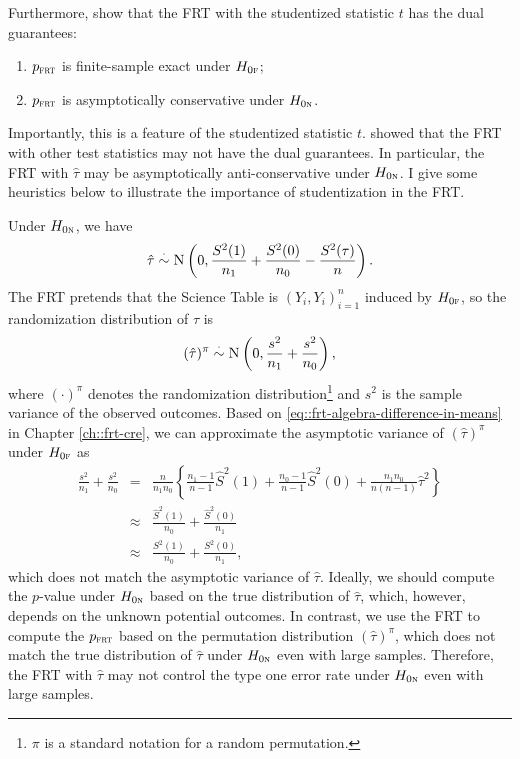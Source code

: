 Furthermore, \citet{ding2017randomization} show that the FRT with the studentized statistic $t$ has the dual guarantees:
\begin{enumerate}
\item 
 $p_{\textsc{frt}}$ is finite-sample exact under $H_{0\textsc{f}}$;
\item
 $p_{\textsc{frt}}$ is asymptotically conservative under $H_{0\textsc{n}}$.
\end{enumerate}
Importantly, this is a feature of the studentized statistic $t$. \citet{ding2017randomization} showed that the FRT with other test statistics may not have the dual guarantees. In particular, the FRT with $\hat{\tau}$ may be asymptotically anti-conservative under $H_{0\textsc{n}}$. I give some heuristics below to illustrate the importance of studentization in the FRT. 


Under $H_{0\textsc{n}}$, we have
$$
\hat{\tau} \stackrel{\cdot}{\sim} \textsc{N}\left(0,    \frac{S^2(1)}{n_1} + \frac{S^2(0)}{n_0} -  \frac{S^2(\tau)}{n}    \right).
$$
The FRT pretends that the Science Table is $(Y_i, Y_i)_{i=1}^n$ induced by $H_{0\textsc{f}}$, so the randomization distribution of $\hat{\tau} $ is
$$
(\hat{\tau} )^\pi \stackrel{\cdot}{\sim} \textsc{N}\left(0,    \frac{s^2}{n_1} + \frac{s^2}{n_0}    \right),
$$
where $(\cdot)^\pi$ denotes the randomization distribution\footnote{$\pi$ is a standard notation for a random permutation.}
 and 
$
s^2 
$
is the sample variance of the observed outcomes. Based on \eqref{eq::frt-algebra-difference-in-means} in Chapter \ref{ch::frt-cre}, we can approximate the asymptotic variance of $(\hat{\tau} )^\pi$ under $H_{0\textsc{f}}$ as
\begin{eqnarray*}
\frac{s^2}{n_1} + \frac{s^2}{n_0} 
& =& \frac{n}{n_1 n_0}  \left\{ 
 \frac{n_1 -1}{ n-1 } \hat S^2(1) + \frac{n_0 - 1}{n-1} \hat S^2(0) + \frac{n_1n_0}{n(n-1)} \hat\tau^2
 \right\} \\
&\approx & \frac{\hat S^2(1) }{n_0} +  \frac{\hat S^2(0) }{n_1} \\ 
&\approx & \frac{  S^2(1) }{n_0} +  \frac{  S^2(0) }{n_1},
\end{eqnarray*}
 which does not match the asymptotic variance of $\hat{\tau} $. Ideally, we should compute the $p$-value under $H_{0\textsc{n}}$ based on the true distribution of $\hat{\tau} $, which, however, depends on the unknown potential outcomes. In contrast, we use the FRT to compute the $p_{\textsc{frt}}$ based on the permutation distribution $(\hat{\tau} )^\pi $, which does not match the true distribution of $\hat{\tau} $ under $H_{0\textsc{n}}$ even with large samples. Therefore, the FRT with $\hat\tau$ may not control the type one error rate under $H_{0\textsc{n}}$ even with large samples. 
 
